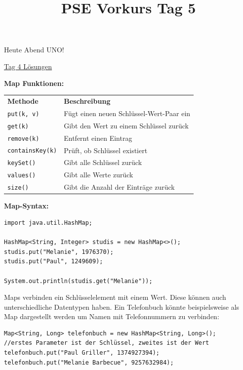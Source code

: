 \documentclass{../../sheet}
\title{PSE Vorkurs Tag 5}
\begin{document}
\maketitle
Heute Abend UNO!

\href{https://fius.de/wp-content/uploads/2025/10/Day4Musterloesung.zip}{Tag 4 Lösungen}

\textbf{Map Funktionen:}
\begin{table}[h]
		\centering
		\begin{tabular}{l l}
			\rowcolor{tablehead}
			\textbf{Methode}        & \textbf{Beschreibung}                    \\
			\texttt{put(k, v)}      & Fügt einen neuen Schlüssel-Wert-Paar ein \\
			\texttt{get(k)}         & Gibt den Wert zu einem Schlüssel zurück  \\
			\texttt{remove(k)}      & Entfernt einen Eintrag                   \\
			\texttt{containsKey(k)} & Prüft, ob Schlüssel existiert            \\
			\texttt{keySet()}       & Gibt alle Schlüssel zurück               \\
			\texttt{values()}       & Gibt alle Werte zurück                   \\
			\texttt{size()}         & Gibt die Anzahl der Einträge zurück      \\
		\end{tabular}
	\end{table}

\textbf{Map-Syntax:}

\begin{verbatim}
import java.util.HashMap;

HashMap<String, Integer> studis = new HashMap<>();
studis.put("Melanie", 1976370);
studis.put("Paul", 1249609);

System.out.println(studis.get("Melanie"));
	\end{verbatim}


\newpage
{}
Maps verbinden ein Schlüsselelement mit einem Wert. Diese können auch unterschiedliche Datentypen haben. Ein Telefonbuch könnte beispielsweise als Map dargestellt werden um Namen mit Telefonnummern zu verbinden:
\begin{verbatim}
Map<String, Long> telefonbuch = new HashMap<String, Long>();
//erstes Parameter ist der Schlüssel, zweites ist der Wert
telefonbuch.put("Paul Griller", 1374927394);
telefonbuch.put("Melanie Barbecue", 9257632984);
\end{verbatim}
\end{document}
